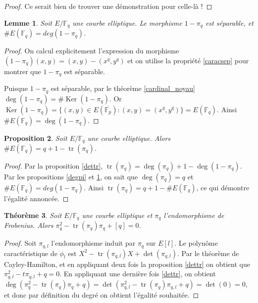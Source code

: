 \documentclass{article}
\theoremstyle{plain}%
\newtheorem{thm}{Théorème}[section]
\newtheorem{prop}[thm]{Proposition}
\newtheorem{lem}[thm]{Lemme}
\theoremstyle{definition}%
\newcommand{\F}{\mathbb{F}}
\DeclareMathOperator{\tr}{tr}
\DeclareMathOperator{\Ker}{Ker}
\begin{document}
\begin{proof}
  {\color{red} Ce serait bien de trouver une démonstration pour celle-là !}
\end{proof}

\begin{lem}
  \label{cardpi}
  Soit $E/\F_q$ une courbe elliptique. Le morphisme $1-\pi_q$ est séparable, et $\#E(\F_q) = deg(1 - \pi_q)$.
\end{lem}

\begin{proof}
  On calcul explicitement l'expression du morphisme $(1-\pi_q)(x, y) = (x, y) - (x^q, y^q)$ et on utilise la propriété \ref{caracsep} pour montrer que $1-\pi_q$ est séparable.

  Puisque $1-\pi_q$ est séparable, par le théorème \ref{cardinal_noyau} $\deg(1-\pi_q) = \# \Ker(1-\pi_q)$. Or $\Ker(1-\pi_q) = \{(x, y) \in E(\overline{\F_p}) : (x, y) = (x^q, y^q) \} = E(\F_q)$. Ainsi $\# E(\F_q) = \deg(1-\pi_q)$.
\end{proof}

\begin{prop}
  Soit $E/\F_q$ une courbe elliptique. Alors $\# E(\F_q) = q+1-\tr(\pi_q)$.
\end{prop}

\begin{proof}
  Par la proposition \ref{dettr}, $\tr(\pi_q) = \deg(\pi_q) + 1 - \deg(1-\pi_q)$. Par les propositions \ref{degpi} et \ref{cardpi}, on sait que $\deg(\pi_q) = q$ et $\#E(\F_q) = deg(1 - \pi_q)$. Ainsi $\tr(\pi_q) = q + 1 - \#E(\F_q)$, ce qui démontre l'égalité annoncée.
\end{proof}

\begin{thm}
  \label{polcarac}
  Soit $E/\F_q$ une courbe elliptique et $\pi_q$ l'endomorphisme de Frobenius. Alors $\pi_q^2 -\tr(\pi_q)\pi_q + [q] = 0$.
\end{thm}

\begin{proof}
  Soit $\pi_{q, l}$ l'endomorphisme induit par $\pi_q$ sur $E[l]$. Le polynôme caractéristique de $\phi_l$ est $X^2 -\tr(\pi_{q,l}) X + \det(\pi_{q, l})$. Par le théorème de Cayley-Hamilton, et en appliquant deux fois la proposition \ref{dettr} on obtient que $\pi_{q,l}^2 - t\pi_{q,l}+q = 0$. En appliquant une dernière fois \ref{dettr}, on obtient $\deg(\pi_{q}^2 - \tr(\pi_q)\pi_{q}+q ) = \det (\pi_{q,l}^2 - \tr(\pi_q)\pi_{q,l}+q ) = \det(0) = 0$, et donc par définition du degré on obtient l'égalité souhaitée.
\end{proof}
\end{document}
